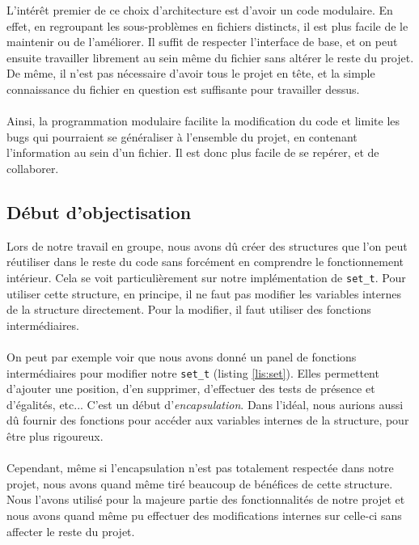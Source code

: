 \documentclass{article}
\begin{document}
L'intérêt premier de ce choix d'architecture est d'avoir un code modulaire. En effet, en regroupant les sous-problèmes en fichiers distincts,
il est plus facile de le maintenir ou de l'améliorer. Il suffit de respecter l'interface de base, et on peut ensuite travailler librement au sein même du fichier
sans altérer le reste du projet. De même, il n'est pas nécessaire d'avoir tous le projet en tête, et la simple connaissance du fichier en question est suffisante
pour travailler dessus.
\\\\
Ainsi, la programmation modulaire facilite la modification du code et limite les bugs qui pourraient se généraliser à l'ensemble du projet, en contenant l'information au sein d'un fichier.
Il est donc plus facile de se repérer, et de collaborer.

\newpage

\subsection{Début d'objectisation}

Lors de notre travail en groupe, nous avons dû créer des structures que l'on peut réutiliser dans le reste du code sans forcément en comprendre le fonctionnement intérieur.
Cela se voit particulièrement sur notre implémentation de \lstinline{set_t}.
Pour utiliser cette structure, en principe, il ne faut pas modifier les variables internes de la structure directement.
Pour la modifier, il faut utiliser des fonctions intermédiaires.
\\\\
On peut par exemple voir que nous avons donné un panel de fonctions intermédiaires pour modifier notre \lstinline{set_t} (listing \ref{lis:set}).
Elles permettent d'ajouter une position, d'en supprimer, d'effectuer des tests de présence et d'égalités, etc...
C'est un début d'\emph{encapsulation}.
Dans l'idéal, nous aurions aussi dû fournir des fonctions pour accéder aux variables internes de la structure, pour être plus rigoureux.
\\\\
Cependant, même si l'encapsulation n'est pas totalement respectée dans notre projet, nous avons quand même tiré beaucoup de bénéfices de cette structure.
Nous l'avons utilisé pour la majeure partie des fonctionnalités de notre projet et nous avons quand même pu effectuer des modifications internes sur celle-ci sans affecter le reste du projet.
\end{document}
